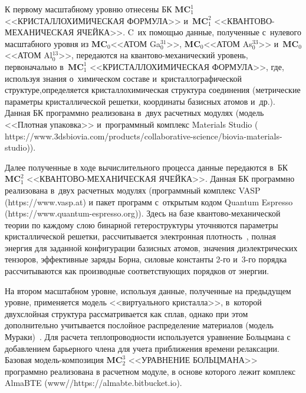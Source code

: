 \begin{multicols}{2}
    К первому масштабному уровню отнесены БК 
    $\mathbf{MC}_1^1$ <<КРИСТАЛЛОХИМИЧЕСКАЯ 
ФОРМУЛА>> и~$\mathbf{MC}_1^2$ <<КВАН\-ТО\-ВО-МЕ\-ХА\-НИ\-ЧЕ\-СКАЯ ЯЧЕЙКА>>. 
C~их по\-мощью данные, полученные с~нулевого масштабного уровня из 
$\mathbf{MC}_0$<<АТОМ Ga$_0^{31}$>>, $\mathbf{MC}_0$<<АТОМ As$_0^{33}$>>
и~$\mathbf{MC}_0$<<АТОМ Al$_0^{13}$>>, передаются на  
кван\-то\-во-ме\-ха\-ни\-че\-ский уровень, первоначально в~$\mathbf{MC}_1^1$ 
<<КРИСТАЛЛОХИМИЧЕСКАЯ ФОРМУЛА>>, где, используя знания о~химическом 
составе и~крис\-тал\-ло\-гра\-фи\-че\-ской структуре,\linebreak определяется крис\-тал\-ло\-хи\-ми\-че\-ская 
структура соединения (мет\-ри\-че\-ские параметры кристалличе\-ской решетки, 
координаты базисных атомов и~др.). Данная БК программно реализована в~двух 
рас\-чет\-ных модулях (модель <<Плотная упаковка>> и~программный комплекс 
Materials Studio ({\sf  
https://www.\linebreak 3dsbiovia.com/products/collaborative-science/biovia-materials-studio})).
    
    Далее полученные в ходе вычислительного процесса данные передаются 
в~БК $\mathbf{MC}_1^2$ <<КВАН\-ТО\-ВО-МЕ\-ХА\-НИ\-ЧЕ\-СКАЯ ЯЧЕЙКА>>. 
Данная БК программно реализована в~двух расчетных модулях 
(программный комплекс VASP ({\sf https://www.\linebreak vasp.at}) и пакет программ 
с~открытым кодом Quantum Espresso ({\sf https://www.quantum-espresso.org})). 
Здесь на базе  
кван\-то\-во-ме\-ха\-ни\-че\-ской теории по каждому слою бинарной 
гетероструктуры уточняются параметры кристаллической решетки, 
рассчитывается электронная плот\-ность~\cite{7-ab}, полная энергия для заданной 
конфигурации базисных атомов, значения диэлектрических тензоров, 
эффективные заряды Борна, силовые константы 2-го и~3-го порядка 
рассчитываются как производные со\-от\-вет\-ст\-ву\-ющих порядков от энергии.
        
    На втором масштабном уровне, используя данные, полученные на 
предыдущем уровне, применяется модель <<виртуального кристалла>>, 
в~которой двухслойная структура рассматривается как сплав, однако при этом 
дополнительно учитывается послойное распределение материалов (модель 
Мураки)~\cite{17-ab}. Для расчета теплопроводности используется уравнение 
Больцмана с добавлением барьерного члена для учета приближения времени 
релаксации. Базовая  
мо\-дель-ком\-по\-зи\-ция $\mathbf{MC}_2^3$ <<УРАВНЕНИЕ БОЛЬЦМАНА>> 
программно реализована в расчетном модуле, в основе которого лежит 
комплекс AlmaBTE ({\sf www//https://almabte.bitbucket.io}).


\end{multicols}
